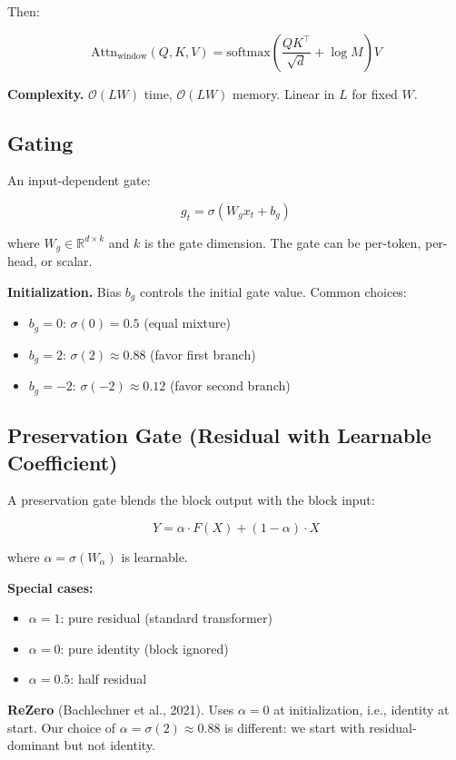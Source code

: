 Then:

\[
\text{Attn}_\text{window}(Q, K, V) = \text{softmax}\!\left(\frac{QK^\top}{\sqrt{d}} + \log M\right)V
\tag{3.3}
\]

\textbf{Complexity.} $\mathcal{O}(L W)$ time, $\mathcal{O}(L W)$ memory. Linear 
in $L$ for fixed $W$.

\subsection{Gating}

An input-dependent gate:

\[
g_t = \sigma(W_g x_t + b_g)
\tag{3.4}
\]

where $W_g \in \mathbb{R}^{d \times k}$ and $k$ is the gate dimension. 
The gate can be per-token, per-head, or scalar.

\textbf{Initialization.} Bias $b_g$ controls the initial gate value. Common choices:
\begin{itemize}
\item $b_g = 0$: $\sigma(0) = 0.5$ (equal mixture)
\item $b_g = 2$: $\sigma(2) \approx 0.88$ (favor first branch)
\item $b_g = -2$: $\sigma(-2) \approx 0.12$ (favor second branch)

\end{itemize}
\subsection{Preservation Gate (Residual with Learnable Coefficient)}

A preservation gate blends the block output with the block input:

\[
Y = \alpha \cdot F(X) + (1 - \alpha) \cdot X
\tag{3.5}
\]

where $\alpha = \sigma(W_\alpha)$ is learnable.

\textbf{Special cases:}
\begin{itemize}
\item $\alpha = 1$: pure residual (standard transformer)
\item $\alpha = 0$: pure identity (block ignored)
\item $\alpha = 0.5$: half residual

\end{itemize}
\textbf{ReZero} (Bachlechner et al., 2021). Uses $\alpha = 0$ at initialization, 
i.e., identity at start. Our choice of $\alpha = \sigma(2) \approx 0.88$ is 
different: we start with residual-dominant but not identity.


